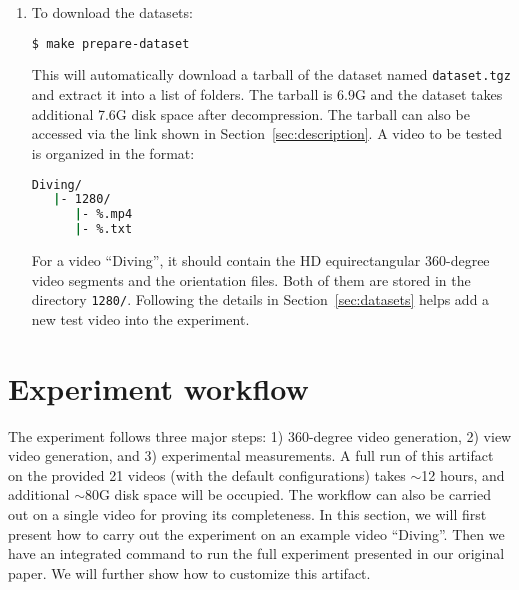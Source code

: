 \begin{enumerate}[leftmargin=*]
\item To download the datasets:
\begin{lstlisting}[language=bash, numbers=none, morekeywords={make, git, clone}, deletekeywords={enable}]
  $ make prepare-dataset
\end{lstlisting}
This will automatically download a tarball of the dataset named {\tt dataset.tgz} and extract it into a list of
folders. The tarball is 6.9G and the dataset takes additional 7.6G disk space after decompression. The tarball can also
be accessed via the link shown in Section~\ref{sec:description}. A video to be tested is organized in the format:
\begin{lstlisting}[language=bash, numbers=none, frame=none, morekeywords={mm19-artifact, layouts, shaders, Diving, 1280}]
  Diving/
   |- 1280/
      |- %.mp4
      |- %.txt
\end{lstlisting}
For a video ``Diving'', it should contain the HD equirectangular 360-degree video segments and the orientation
files. Both of them are stored in the directory {\tt 1280/}. Following the details in Section~\ref{sec:datasets} helps
add a new test video into the experiment.


\end{enumerate}


\section{Experiment workflow}
\label{sec:workflow}

The experiment follows three major steps: 1) 360-degree video generation, 2) view video generation, and 3) experimental measurements. A
full run of this artifact on the provided 21 videos (with the default configurations) takes $\sim$12 hours, and
additional $\sim$80G disk space will be occupied. The workflow can also be carried out on a single video for proving its
completeness. In this section, we will first present how to carry out the experiment on an example video
``Diving''. Then we have an integrated command to run the full experiment presented in our original paper. We will
further show how to customize this artifact.


